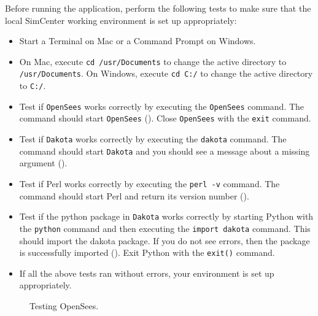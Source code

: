 Before running the \texttt{\getsoftwarename{}} application, perform the following tests to
make sure that the local SimCenter working environment is set up
appropriately:

\begin{itemize}
    \item Start a Terminal on Mac or a Command Prompt on Windows.
    \item On Mac, execute \texttt{cd /usr/Documents} to change the active directory to \texttt{/usr/Documents}. On Windows, execute \texttt{cd C:/} to change the active directory to \texttt{C:/}.
    \item Test if \texttt{OpenSees} works correctly by executing the \texttt{OpenSees} command. The command should start \texttt{OpenSees} (). Close \texttt{OpenSees} with the \texttt{exit} command.
    \item Test if \texttt{Dakota} works correctly by executing the \texttt{dakota} command. The command should start \texttt{Dakota} and you should see a message about a missing argument ().
    \item Test if Perl works correctly by executing the \texttt{perl -v} command. The command should start Perl and return its version number ().
    \item Test if the python package in \texttt{Dakota} works correctly by starting Python with the \texttt{python} command and then executing the \texttt{import dakota} command. This should import the dakota package. If you do not see errors, then the package is successfully imported (). Exit Python with the \texttt{exit()} command.
    \item If all the above tests ran without errors, your environment is set up appropriately.
\end{itemize}

\begin{figure}[!htbp]
  \caption{Testing OpenSees.}
  \label{fig:opensees_test}
\end{figure}

